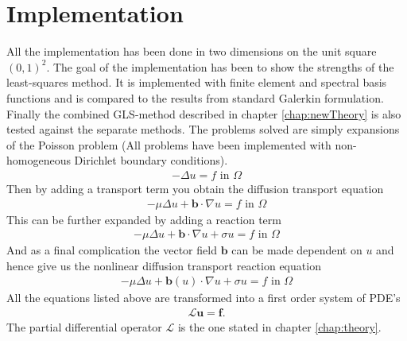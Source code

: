 
\chapter{Implementation} %

\label{chap:Implementation} %



All the implementation has been done in two dimensions on the unit square $(0,1)^2$. The goal of the implementation has been to show the strengths of the least-squares method. It is implemented with finite element and spectral basis functions and is compared to the results from standard Galerkin formulation. Finally the combined GLS-method described in chapter \ref{chap:newTheory} is also tested against the separate methods. The problems solved are simply expansions of the Poisson problem (All problems have been implemented with non-homogeneous Dirichlet boundary conditions). 
\begin{align}
	-\Delta u = f \text{  in  } \Omega
	\label{eq:PossionImplementation}
\end{align}
Then by adding a transport term you obtain the diffusion transport equation
\begin{align}
	-\mu \Delta u + \mathbf{b} \cdot \nabla u = f \text{ in } \Omega
	\label{eq:DiffTransImplementation}
\end{align}
This can be further expanded by adding a reaction term
\begin{align}
	-\mu \Delta u + \mathbf{b} \cdot \nabla u +\sigma u = f \text{ in } \Omega
	\label{eq:ReactionImplementation}
\end{align}
And as a final complication the vector field $\mathbf{b}$ can be made dependent on $u$ and hence give us the nonlinear diffusion transport reaction equation
\begin{align}
	-\mu \Delta u + \mathbf{b}(u) \cdot \nabla u +\sigma u = f \text{ in } \Omega
	\label{eq:ReactionImplementation}
\end{align}
%
All the equations listed above are transformed into a first order system of PDE's 
\begin{align}
	\mathcal{L}\mathbf{u} = \mathbf{f}.
	\label{eq:genFirstOrderFormulation}
\end{align}
The partial differential operator $\mathcal{L}$ is the one stated in chapter
\ref{chap:theory}.


